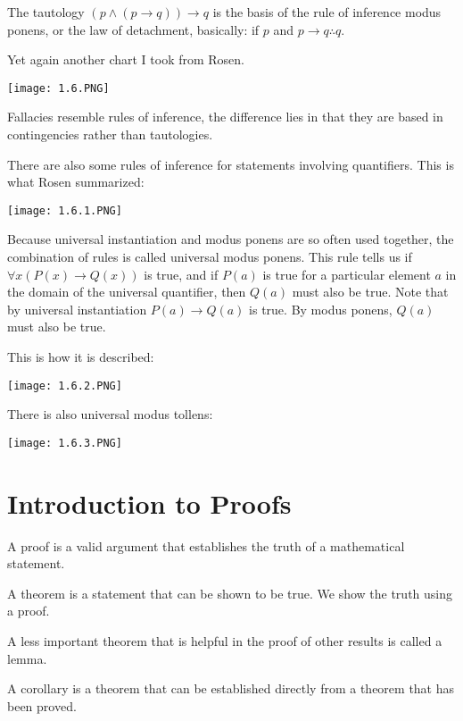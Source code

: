 \documentclass[../discrete.tex]{subfiles}
\begin{document}
The tautology $(p\land(p\rightarrow q))\rightarrow q$ is the basis of the rule of inference 
modus ponens, or the law of detachment, basically: if $p$ and $p\rightarrow q \therefore q$.

Yet again another chart I took from Rosen.
\begin{center}
    \texttt{[image: 1.6.PNG]}
\end{center}

Fallacies resemble rules of inference, the difference lies in that they are based in contingencies rather than tautologies.

There are also some rules of inference for statements involving quantifiers.
This is what Rosen summarized:
\begin{center}
    \texttt{[image: 1.6.1.PNG]}
\end{center}

Because universal instantiation and modus ponens are so often used together, the combination of rules 
is called universal modus ponens. This rule tells us if $\forall x (P(x)\rightarrow Q(x))$ is true, 
and if $P(a)$ is true for a particular element $a$ in the domain of the universal quantifier, 
then $Q(a)$ must also be true. Note that by universal instantiation $P(a)\rightarrow Q(a)$ is true. 
By modus ponens, $Q(a)$ must also be true. 

This is how it is described:
\begin{center}
    \texttt{[image: 1.6.2.PNG]}
\end{center}

There is also universal modus tollens:
\begin{center}
    \texttt{[image: 1.6.3.PNG]}
\end{center}

\section{Introduction to Proofs}
A proof is a valid argument that establishes the truth of a mathematical statement. 

A theorem is a statement that can be shown to be true. We show the truth using a proof.

A less important theorem that is helpful in the proof of other results is called a lemma. 

A corollary is a theorem that can be established directly from a theorem that has been proved. 
\end{document}
